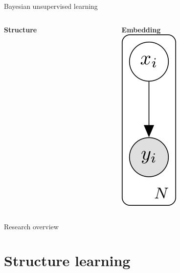 \documentclass[10pt, compress]{beamer}
\begin{document}
\begin{frame}{Bayesian unsupervised learning}
  \centering
  \begin{columns}[T]
    \begin{column}{0.5\textwidth}
      \begin{overlayarea}{\textwidth}{7cm}
        \begin{center}
          \Large \textbf{Structure}\\ \vspace{10pt}
        \end{center}
      \end{overlayarea}
    \end{column}
    \begin{column}{0.5\textwidth}
      \begin{overlayarea}{\textwidth}{5cm}
        \pause
        \centering
        \Large \textbf{Embedding} \\ \vspace{60pt}
        \includegraphics[]{img/bayesian-intro-right-1}
      \end{overlayarea}
    \end{column}
  \end{columns}
\end{frame}

\begin{frame}{Research overview}
  \centering
\end{frame}

\section{Structure learning}
\end{document}
